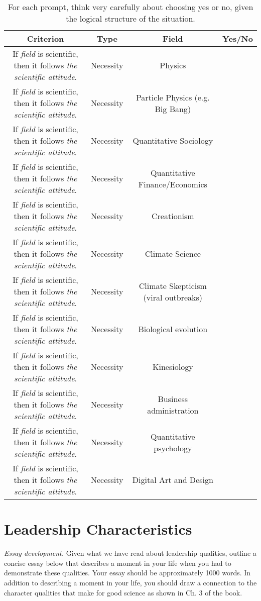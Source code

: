 \documentclass{article}
\begin{document}
\begin{table}[ht]
\centering
\begin{tabular}{| c | c | c | c |}
\hline
Criterion & Type & Field & Yes/No \\ \hline \hline
If \textit{field} is scientific, then it follows \textit{the scientific attitude}. & Necessity & Physics & \\ \hline
If \textit{field} is scientific, then it follows \textit{the scientific attitude}. & Necessity & Particle Physics (e.g. Big Bang) & \\ \hline
If \textit{field} is scientific, then it follows \textit{the scientific attitude}. & Necessity & Quantitative Sociology & \\ \hline
If \textit{field} is scientific, then it follows \textit{the scientific attitude}. & Necessity & Quantitative Finance/Economics & \\ \hline
If \textit{field} is scientific, then it follows \textit{the scientific attitude}. & Necessity & Creationism & \\ \hline
If \textit{field} is scientific, then it follows \textit{the scientific attitude}. & Necessity & Climate Science & \\ \hline
If \textit{field} is scientific, then it follows \textit{the scientific attitude}. & Necessity & Climate Skepticism (viral outbreaks) & \\ \hline
If \textit{field} is scientific, then it follows \textit{the scientific attitude}. & Necessity & Biological evolution & \\ \hline
If \textit{field} is scientific, then it follows \textit{the scientific attitude}. & Necessity & Kinesiology & \\ \hline
If \textit{field} is scientific, then it follows \textit{the scientific attitude}. & Necessity & Business administration & \\ \hline
If \textit{field} is scientific, then it follows \textit{the scientific attitude}. & Necessity & Quantitative psychology & \\ \hline
If \textit{field} is scientific, then it follows \textit{the scientific attitude}. & Necessity & Digital Art and Design & \\ \hline
\end{tabular}
\caption{\label{tab:1} For each prompt, think very carefully about choosing yes or no, given the logical structure of the situation.}
\end{table}

\section{Leadership Characteristics}

\textit{Essay development.}  Given what we have read about leadership qualities, outline a concise essay below that describes a moment in your life when you had to demonstrate these qualities.  Your essay should be approximately 1000 words.  In addition to describing a moment in your life, you should draw a connection to the character qualities that make for good science as shown in Ch. 3 of the book.
\end{document}
